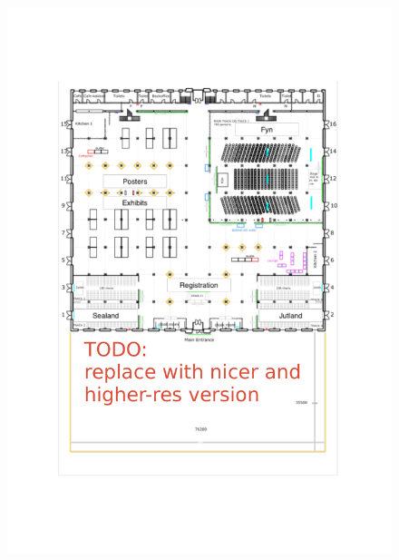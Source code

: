 \begin{figure}[p]
\centering
\includegraphics[width=\textwidth]{content/floorplan_oeksnehallen.pdf}
\end{figure}
